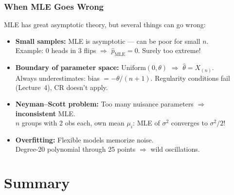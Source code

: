 \documentclass[aspectratio=169]{beamer}
\begin{document}
\begin{frame}
\frametitle{When MLE Goes Wrong}

\small
MLE has great asymptotic theory, but several things can go wrong:

\vspace{0.15cm}
\begin{itemize}\setlength{\itemsep}{4pt}
  \item \textbf{Small samples:} MLE is asymptotic --- can be poor for small $n$.\\
    {\footnotesize Example: 0 heads in 3 flips $\Rightarrow$ $\hat{p}_{\text{MLE}} = 0$. Surely too extreme!}

  \pause
  \item \textbf{Boundary of parameter space:} $\text{Uniform}(0, \theta)$ $\Rightarrow$ $\hat\theta = X_{(n)}$.\\
    {\footnotesize Always underestimates: bias $= -\theta/(n{+}1)$. Regularity conditions fail (Lecture~4), CR doesn't apply.}

  \pause
  \item \textbf{Neyman--Scott problem:} Too many nuisance parameters $\Rightarrow$ \textbf{inconsistent} MLE.\\
    {\footnotesize $n$ groups with 2 obs each, own mean $\mu_i$: MLE of $\sigma^2$ converges to $\sigma^2/2$!}

  \pause
  \item \textbf{Overfitting:} Flexible models memorize noise.\\
    {\footnotesize Degree-20 polynomial through 25 points $\Rightarrow$ wild oscillations.}
\end{itemize}

\vspace{0.15cm}
\begin{center}
\end{center}
\end{frame}

\section{Summary}
\end{document}
